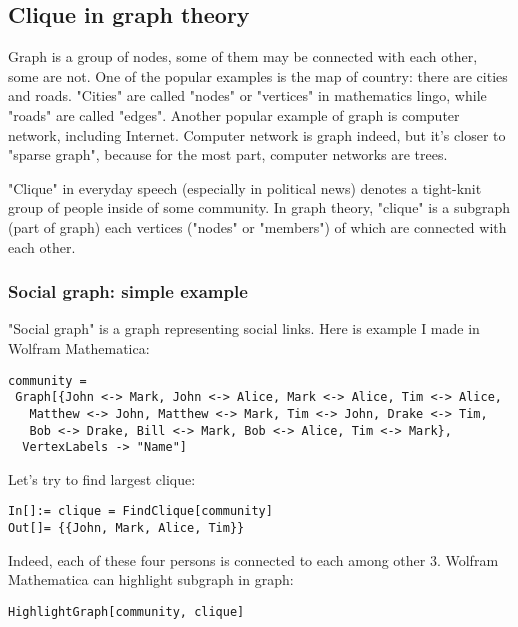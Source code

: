 \subsection{Clique in graph theory}

\renewcommand{\CURPATH}{MaxSMT/clique}

Graph is a group of nodes, some of them may be connected with each other, some are not.
One of the popular examples is the map of country: there are cities and roads.
"Cities" are called "nodes" or "vertices" in mathematics lingo, while "roads" are called "edges".
Another popular example of graph is computer network, including Internet.
Computer network is graph indeed, but it's closer to "sparse graph", because for the most part, computer networks are trees.

"Clique" in everyday speech (especially in political news) denotes a tight-knit group of people inside of some community.
In graph theory, "clique" is a subgraph (part of graph) each vertices ("nodes" or "members") of which are connected with each other.

\subsubsection{Social graph: simple example}

"Social graph" is a graph representing social links.
Here is example I made in Wolfram Mathematica:

\begin{lstlisting}
community = 
 Graph[{John <-> Mark, John <-> Alice, Mark <-> Alice, Tim <-> Alice, 
   Matthew <-> John, Matthew <-> Mark, Tim <-> John, Drake <-> Tim, 
   Bob <-> Drake, Bill <-> Mark, Bob <-> Alice, Tim <-> Mark}, 
  VertexLabels -> "Name"]
\end{lstlisting}

\begin{figure}[H]
\centering
{}
\end{figure}

Let's try to find largest clique:

\begin{lstlisting}
In[]:= clique = FindClique[community]
Out[]= {{John, Mark, Alice, Tim}}
\end{lstlisting}

Indeed, each of these four persons is connected to each among other 3.
Wolfram Mathematica can highlight subgraph in graph:

\begin{lstlisting}
HighlightGraph[community, clique]
\end{lstlisting}

